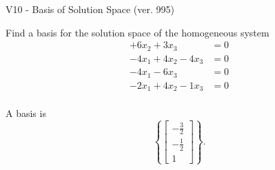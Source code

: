 \begin{exercise}
  \begin{exerciseTitle}V10 - Basis of Solution Space (ver. 995)\end{exerciseTitle}
  \begin{exerciseStatement}
    Find a basis for the solution space of the homogeneous system 
\begin{align*}
 + 6 x_ 2 + 3 x_ 3 &= 0  \\ 
  -4 x_ 1 + 4 x_ 2 -4 x_ 3 &= 0  \\ 
  -4 x_ 1 -6 x_ 3 &= 0  \\ 
  -2 x_ 1 + 4 x_ 2 -1 x_ 3 &= 0  \\ 
 \end{align*}


 
  \end{exerciseStatement}

  \begin{exerciseAnswer}
   A basis is   
\[\left\{\left[\begin{array}{c}
-\frac{3}{2} \\
-\frac{1}{2} \\
1
\end{array}\right]\right\}.\]

  


  \end{exerciseAnswer}
\end{exercise}